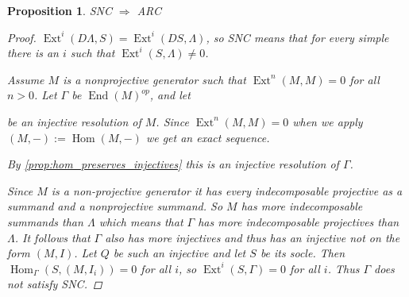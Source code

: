 \documentclass[11pt, a4paper, english]{article}
\newtheorem{prop}[theorem]{Proposition}
\theoremstyle{definition}
\DeclareMathOperator{\Hom}{Hom}
\DeclareMathOperator{\Ext}{Ext}
\DeclareMathOperator{\End}{End}
\begin{document}
\begin{prop}
	SNC $\Rightarrow$ ARC
	\begin{proof}
		$\Ext^i(D\Lambda, S) = \Ext^i(DS, \Lambda)$, so SNC means that for every simple there is an $i$ such that $\Ext^i(S, \Lambda) \neq 0$.
		
		Assume $M$ is a nonprojective generator such that $\Ext^n(M, M)=0$ for all $n>0$. Let $\Gamma$ be $\End(M)^{op}$, and let
		\begin{center}
		\end{center}
		be an injective resolution of $M$. Since $\Ext^n(M,M)=0$ when we apply $(M,-):=\Hom(M,-)$ we get an exact sequence.
		\begin{center}
		\end{center}
		By \cref{prop:hom_preserves_injectives} this is an injective resolution of $\Gamma$.
		
		Since $M$ is a non-projective generator it has every indecomposable projective as a summand and a nonprojective summand. So $M$ has more indecomposable summands than $\Lambda$ which means that $\Gamma$ has more indecomposable projectives than $\Lambda$. It follows that $\Gamma$ also has more injectives and thus has an injective not on the form $(M, I)$. Let $Q$ be such an injective and let $S$ be its socle. Then $\Hom_\Gamma(S, (M, I_i)) = 0$ for all $i$, so $\Ext^i(S, \Gamma) = 0$ for all $i$. Thus $\Gamma$ does not satisfy SNC.
	\end{proof}
\end{prop}
\end{document}
